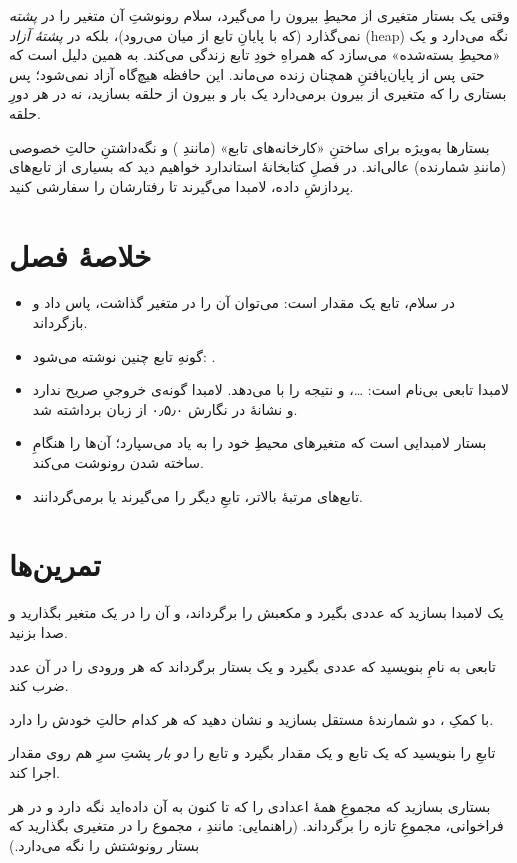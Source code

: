 \begin{deep}
وقتی یک بستار متغیری از محیطِ بیرون را می‌گیرد، سلام رونوشتِ آن متغیر را در
\emph{پشته} نمی‌گذارد (که با پایانِ تابع از میان می‌رود)، بلکه در \emph{پشتهٔ
آزاد} (heap) نگه می‌دارد و یک «محیطِ بسته‌شده» می‌سازد که همراهِ خودِ تابع
زندگی می‌کند. به همین دلیل است که  حتی پس از پایان‌یافتنِ
 همچنان زنده می‌ماند. این حافظه هیچ‌گاه آزاد نمی‌شود؛ پس
بستاری را که متغیری از بیرون برمی‌دارد یک بار و بیرون از حلقه بسازید، نه در
هر دورِ حلقه.
\end{deep}

\begin{tip}
بستارها به‌ویژه برای ساختنِ «کارخانه‌های تابع» (مانندِ ) و
نگه‌داشتنِ حالتِ خصوصی (مانندِ شمارنده) عالی‌اند. در فصلِ کتابخانهٔ استاندارد
خواهیم دید که بسیاری از تابع‌های پردازشِ داده، لامبدا می‌گیرند تا رفتارشان را
سفارشی کنید.
\end{tip}

\section{خلاصهٔ فصل}

\begin{itemize}
  \item در سلام، تابع یک مقدار است: می‌توان آن را در متغیر گذاشت، پاس داد و
        بازگرداند.
  \item گونهِ تابع چنین نوشته می‌شود: .
  \item لامبدا تابعی بی‌نام است:  \ldots {}،
        و نتیجه را با  می‌دهد. لامبدا گونه‌ی خروجیِ صریح ندارد و
        نشانهٔ \code{=>} در نگارش ۰٫۵٫۰ از زبان برداشته شد.
  \item بستار لامبدایی است که متغیرهای محیطِ خود را به یاد می‌سپارد؛ آن‌ها را
        هنگامِ ساخته شدن رونوشت می‌کند.
  \item تابع‌های مرتبهٔ بالاتر، تابعِ دیگر را می‌گیرند یا برمی‌گردانند.
\end{itemize}

\section{تمرین‌ها}

\exercise یک لامبدا بسازید که عددی بگیرد و مکعبش را برگرداند، و آن را در یک
متغیر بگذارید و صدا بزنید.

\exercise تابعی به نامِ  بنویسید که عددی بگیرد و یک بستار
برگرداند که هر ورودی را در آن عدد ضرب کند.

\exercise با کمکِ ، دو شمارندهٔ مستقل بسازید و نشان دهید که
هر کدام حالتِ خودش را دارد.

\exercise تابعِ  را بنویسید که یک تابع و یک مقدار بگیرد و
تابع را \emph{دو بار} پشتِ سرِ هم روی مقدار اجرا کند.

\exercise بستاری بسازید که مجموعِ همهٔ اعدادی را که تا کنون به آن داده‌اید نگه
دارد و در هر فراخوانی، مجموعِ تازه را برگرداند. (راهنمایی: مانندِ
، مجموع را در متغیری بگذارید که بستار رونوشتش را نگه می‌دارد.)

